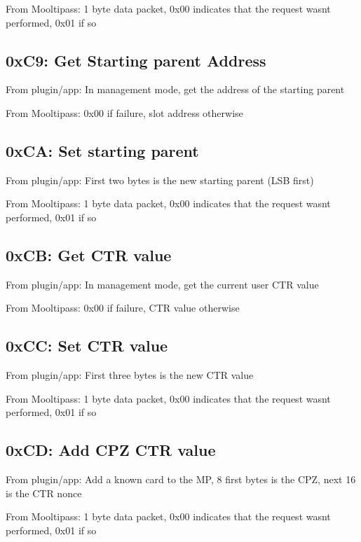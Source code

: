 From Mooltipass\+: 1 byte data packet, 0x00 indicates that the request wasn\textquotesingle{}t performed, 0x01 if so

\subsection*{0x\+C9\+: Get Starting parent Address }

From plugin/app\+: In management mode, get the address of the starting parent

From Mooltipass\+: 0x00 if failure, slot address otherwise

\subsection*{0x\+CA\+: Set starting parent }

From plugin/app\+: First two bytes is the new starting parent (L\+SB first)

From Mooltipass\+: 1 byte data packet, 0x00 indicates that the request wasn\textquotesingle{}t performed, 0x01 if so

\subsection*{0x\+CB\+: Get C\+TR value }

From plugin/app\+: In management mode, get the current user C\+TR value

From Mooltipass\+: 0x00 if failure, C\+TR value otherwise

\subsection*{0x\+CC\+: Set C\+TR value }

From plugin/app\+: First three bytes is the new C\+TR value

From Mooltipass\+: 1 byte data packet, 0x00 indicates that the request wasn\textquotesingle{}t performed, 0x01 if so

\subsection*{0x\+CD\+: Add C\+PZ C\+TR value }

From plugin/app\+: Add a known card to the MP, 8 first bytes is the C\+PZ, next 16 is the C\+TR nonce

From Mooltipass\+: 1 byte data packet, 0x00 indicates that the request wasn\textquotesingle{}t performed, 0x01 if so

